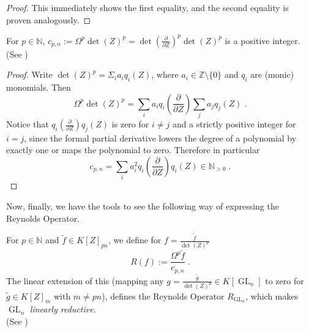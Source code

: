 \begin{proof}
  This immediately shows the first equality, and the second equality is proven analogously.
\end{proof}

\begin{lemma}
  For $p \in \mathbb{N} $, $ c_{p,n} := \Omega^p  \operatorname{det} (Z)^p = \operatorname{det} \left( \frac{\partial}{\partial Z}\right)^p  \operatorname{det} (Z)^p $ is a positive integer.  \\
  (See \cite[4.5.26]{DK15})
\end{lemma}

\begin{proof}
  Write $ \operatorname{det} (Z)^p = \Sigma_i a_i q_i \left( Z \right) $, where $a_i \in \mathbb{Z} \setminus \{0\}$ and $q_i$ are (monic) monomials.
  Then
  \begin{equation*}
    \Omega^p  \operatorname{det} (Z)^p 
    = \sum_i a_i q_i \left( \frac{\partial}{\partial Z} \right)  \sum_j a_j q_j \left( Z \right) \; . 
  \end{equation*}
  Notice that $ q_i \left(  \frac{\partial}{\partial Z} \right)  q_j \left( Z \right)  $ is zero for $ i \neq j $ and a strictly positive integer for $ i = j $, since the formal partial derivative lowers the degree of a polynomial by exactly one or maps the polynomial to zero.
  Therefore in particular
  \begin{equation*}
    c_{p,n}
    = \sum_i a_i^2 q_i \left(  \frac{\partial}{\partial Z} \right) q_i \left( Z  \right) \in \mathbb{N}_{>0} \; .
  \end{equation*}
\end{proof}
Now, finally, we have the tools to see the following way of expressing the Reynolds Operator.
\begin{theorem}\label{cay}
  For $ p \in \mathbb{N} $ and $ \tilde{f} \in K \left\lbrack Z \right\rbrack_{pn} $,  we define for $ f = \frac{\tilde{f}}{\operatorname{det}(Z)^p}$
  \begin{equation*}
    R \left( f \right) := \frac{\Omega^p \tilde{f}}{c_{p,n}} \; .
  \end{equation*}
  The linear extension of this (mapping any $g = \frac{\tilde{g}}{\operatorname{det}(Z)^p} \in K[\operatorname{GL}_n]$ to zero for $\tilde{g} \in K[Z]_m$ with $m \neq pn$), defines the Reynolds Operator $R_{\operatorname{GL}_n}$, which makes $\operatorname{GL}_n$ \textit{linearly reductive}.  \\
  (See \cite[4.5.27]{DK15})
\end{theorem}

